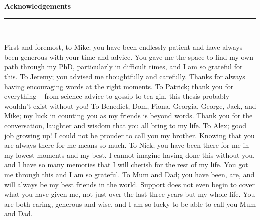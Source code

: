 \thispagestyle{empty}
\begin{raggedleft}
\vspace*{23mm}
\hfill {\huge {\bf {Acknowledgements}}} \\
\vspace{6mm}
\hfill \rule{4in}{.015in} \\
\vspace{19mm}
\end{raggedleft}


First and foremost, to Mike;  you have been endlessly patient and have always been generous with your time and advice.  You gave me the  space to find my own path through my PhD, particularly in difficult times, and I am so grateful for this.  
To Jeremy; %
you advised me thoughtfully and carefully. Thanks for always having  encouraging words at the right moments.
To Patrick; %
thank you for everything -- %
from science advice to gossip to tea gin, this thesis probably wouldn't exist without you!
To 
Benedict,
Dom,
Fiona,
Georgia,
George,
Jack,
and
Mike;  my luck in counting you as my friends is beyond words. %
Thank you for the
conversation, laughter and wisdom that you all bring to my life.  
To Alex;  good job growing up! I could not be prouder to call you my brother.  Knowing that you are always there for me means so much. 
%
To Nick; you have been there for me in my lowest moments and my best.  
I cannot imagine having done this without you, and I have so many memories that I will cherish for the rest of my life.  
You got me through this 
and I am so grateful.
To Mum and Dad;  you have been, are, and will always be my best friends in the world.  Support does not even begin to cover what you have given me, not just over the last three years but my whole life.  You are both caring, generous and wise, and I am so lucky to be able to call you Mum and Dad.  
\bigskip


